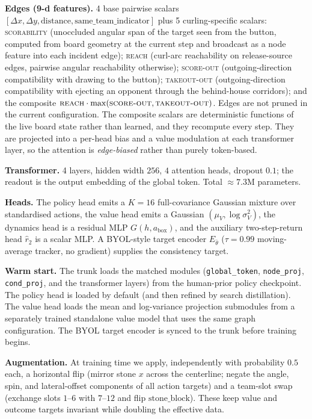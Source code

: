 \documentclass[11pt]{article}
\begin{document}
\textbf{Edges (9-d features).} 4 base pairwise scalars
$[\Delta x, \Delta y, \text{distance}, \text{same\_team\_indicator}]$
plus 5 curling-specific scalars:
\textsc{scorability} (unoccluded angular span of the target seen from the
button, computed from board geometry at the current step and broadcast as a
node feature into each incident edge);
\textsc{reach} (curl-arc reachability on release-source edges, pairwise
angular reachability otherwise);
\textsc{score-out} (outgoing-direction compatibility with drawing to the
button);
\textsc{takeout-out} (outgoing-direction compatibility with ejecting an
opponent through the behind-house corridors);
and the composite $\textsc{reach}\cdot\max(\textsc{score-out},
\textsc{takeout-out})$. Edges are not pruned in the current configuration.
The composite scalars are deterministic functions of the live board state
rather than learned, and they recompute every step. They are projected into
a per-head bias and a value modulation at each transformer layer, so the
attention is \emph{edge-biased} rather than purely token-based.

\textbf{Transformer.} 4 layers, hidden width $256$, $4$ attention heads,
dropout $0.1$; the readout is the output embedding of the global token.
Total $\approx 7.3$M parameters.

\textbf{Heads.} The policy head emits a $K=16$ full-covariance Gaussian
mixture over standardised actions, the value head emits a Gaussian
$(\mu_V,\log\sigma_V^2)$, the dynamics head is a residual MLP
$G(h,a_{\text{box}})$, and the auxiliary two-step-return head $\hat r_2$
is a scalar MLP. A BYOL-style target encoder $E_{\bar\theta}$ ($\tau=0.99$
moving-average tracker, no gradient) supplies the consistency target.

\textbf{Warm start.} The trunk loads the matched modules
(\texttt{global\_token}, \texttt{node\_proj}, \texttt{cond\_proj}, and the
transformer layers) from the human-prior policy checkpoint. The policy head
is loaded by default (and then refined by search distillation). The value
head loads the mean and log-variance projection submodules from a
separately trained standalone value model that uses the same graph
configuration. The BYOL target encoder is synced to the trunk before
training begins.

\textbf{Augmentation.} At training time we apply, independently with
probability $0.5$ each, a horizontal flip (mirror stone $x$ across the
centerline; negate the angle, spin, and lateral-offset components of all
action targets) and a team-slot swap (exchange slots $1$--$6$ with
$7$--$12$ and flip $\text{stone\_block}$). These keep value and outcome
targets invariant while doubling the effective data.
\end{document}
